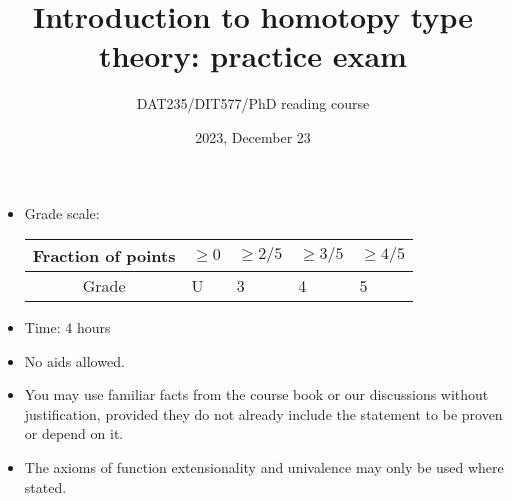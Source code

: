 \documentclass[11pt]{article}
\begin{document}
\title{Introduction to homotopy type theory: practice exam}
\author{DAT235/DIT577/PhD reading course}
\date{2023, December 23}

\maketitle

\begin{itemize}
\item
Grade scale:\qquad
\begin{tabularx}{10cm}{|c|Y|Y|Y|Y|}
  \hline
  Fraction of points & $\geq 0$ & $\geq 2/5$ & $\geq 3/5$ & $\geq 4/5$
  \\\hline
  Grade & U & 3 & 4 & 5
  \\\hline
\end{tabularx}
\item
Time: 4 hours
\item
No aids allowed.
\item
You may use familiar facts from the course book or our discussions without justification, provided they do not already include the statement to be proven or depend on it.
\item
The axioms of function extensionality and univalence may only be used where stated. 
\end{itemize}

\newpage
\end{document}
